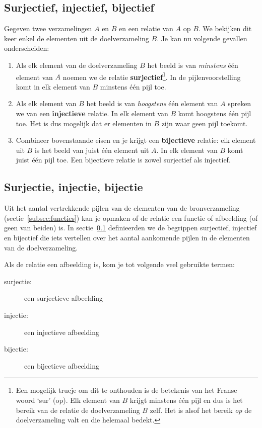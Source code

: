 \subsection{Surjectief, injectief, bijectief} \label{subsec:jectief}
Gegeven twee verzamelingen $A$ en $B$ en een relatie van $A$ op $B$. We bekijken dit keer enkel de elementen uit de doelverzameling $B$. Je kan nu volgende gevallen onderscheiden:
\begin{enumerate}
  \item Als elk element van de doelverzameling $B$ het beeld is van \emph{minstens} één element van $A$ noemen we de relatie \textbf{surjectief}\footnote{Een mogelijk trucje om dit te onthouden is de betekenis van het Franse woord `sur' (op). Elk element van $B$ krijgt minstens één pijl en dus is het bereik van de relatie de doelverzameling $B$ zelf. Het is alsof het bereik \emph{op} de doelverzameling valt en die helemaal bedekt.}. In de pijlenvoorstelling komt in elk element van $B$ minstens één pijl toe.
  \item Als elk element van $B$ het beeld is van \emph{hoogstens} één element van $A$ spreken we van een \textbf{injectieve} relatie. In elk element van $B$ komt hoogstens één pijl toe. Het is dus mogelijk dat er elementen in $B$ zijn waar geen pijl toekomt.
  \item Combineer bovenstaande eisen en je krijgt een \textbf{bijectieve} relatie: elk element uit $B$ is het beeld van juist één element uit $A$. In elk element van $B$ komt juist één pijl toe. Een bijectieve relatie is zowel surjectief als injectief.
\end{enumerate}

\subsection{Surjectie, injectie, bijectie}
Uit het aantal vertrekkende pijlen van de elementen van de bronverzameling (sectie~\ref{subsec:functies}) kan je opmaken of de relatie een functie of afbeelding (of geen van beiden) is. In sectie~\ref{subsec:jectief} definieerden we de begrippen surjectief, injectief en bijectief die iets vertellen over het aantal aankomende pijlen in de elementen van de doelverzameling.

Als de relatie een afbeelding is, kom je tot volgende veel gebruikte termen:
\begin{description}
\item[surjectie:] een surjectieve afbeelding
\item[injectie:] een injectieve afbeelding
\item[bijectie:] een bijectieve afbeelding
\end{description}



